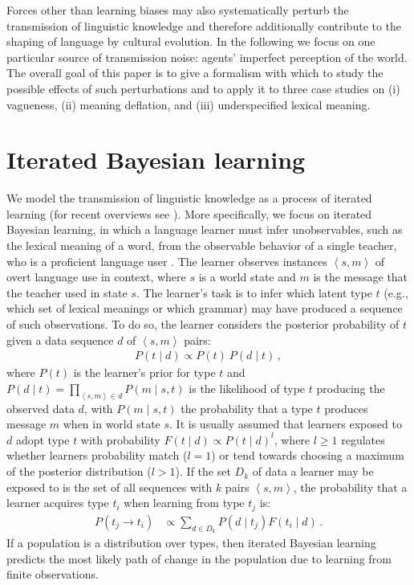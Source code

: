 \documentclass[10pt,a4paper]{article}
\newcommand{\tuple}[1]{\ensuremath{\left\langle #1 \right\rangle}}
\begin{document}
Forces other than learning biases may also systematically perturb the transmission of
linguistic knowledge and therefore additionally contribute to the shaping of language by
cultural evolution.  In the following we focus on one particular source of transmission noise:
agents' imperfect perception of the world. The overall goal of this paper is to give a
formalism with which to study the possible effects of such perturbations and to apply it to
three case studies on (i) vagueness, (ii) meaning deflation, and (iii) underspecified lexical
meaning.

\section{Iterated Bayesian learning}

We model the transmission of linguistic knowledge as a process of iterated learning (for recent
overviews see \citealt{kirby+etal:2014, tamariz+kirby:2016}). More specifically, we focus on
iterated Bayesian learning, in which a language learner must infer unobservables, such as the
lexical meaning of a word, from the observable behavior of a single teacher, who is a
proficient language user \citep[e.g.][]{griffiths+kalish:2007,kirby+etal:2007}. The learner
observes instances $\tuple{s,m}$ of overt language use in context, where $s$ is a world state
and $m$ is the message that the teacher used in state $s$. The learner's task is to infer which
latent type $t$ (e.g., which set of lexical meanings or which grammar) may have produced a
sequence of such observations. To do so, the learner considers the posterior probability of $t$
given a data sequence $d$ of $\tuple{s, m}$ pairs:
\begin{align*}
  P(t \mid d) \propto P(t) \ P(d \mid t)\,,
\end{align*}
where $P(t)$ is the learner's prior for type $t$ and
$P(d \mid t) = \prod_{\tuple{s,m} \in d} P(m \mid s, t)$ is the likelihood of type $t$
producing the observed data $d$, with $P(m \mid s, t)$ the probability that a type $t$ produces
message $m$ when in world state $s$. It is usually assumed that learners exposed to $d$ adopt
type $t$ with probability $F(t \mid d) \propto P(t \mid d)^l$, where $l \ge 1$ regulates
whether learners probability match ($l = 1$) or tend towards choosing a maximum of the
posterior distribution ($l > 1$). If the set $D_k$ of data a learner may be exposed to is the
set of all sequences with $k$ pairs $\tuple{s,m}$, the probability that a learner acquires type
$t_i$ when learning from type $t_j$ is:
\begin{align*}
  P(t_j \rightarrow t_i) &\propto \sum_{d \in D_k} P(d \mid t_j) F(t_i \mid d)\,.
\end{align*}
If a population is a distribution over types, then iterated Bayesian learning predicts the most
likely path of change in the population due to learning from finite observations.
\end{document}
